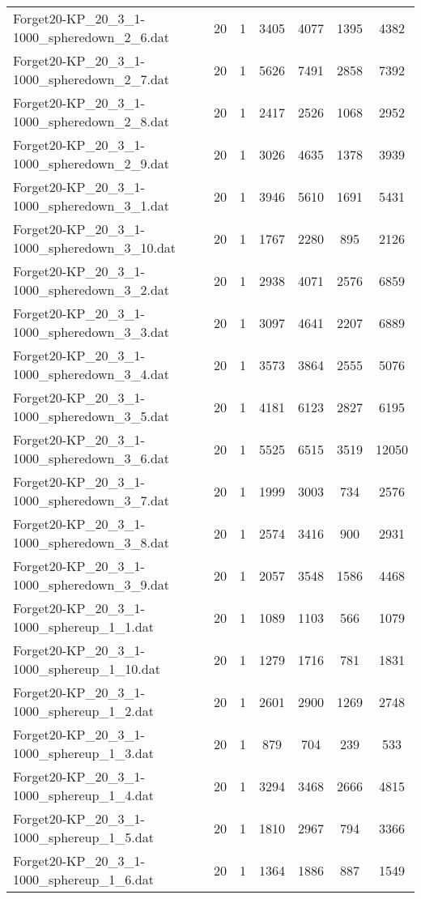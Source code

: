 \begin{table}[!ht]
\begin{tabular}{lcccccc}
Forget20-KP\_20\_3\_1-1000\_spheredown\_2\_6.dat & 20 & 1 & 3405 & 4077 & 1395 & 4382 \\
Forget20-KP\_20\_3\_1-1000\_spheredown\_2\_7.dat & 20 & 1 & 5626 & 7491 & 2858 & 7392 \\
Forget20-KP\_20\_3\_1-1000\_spheredown\_2\_8.dat & 20 & 1 & 2417 & 2526 & 1068 & 2952 \\
Forget20-KP\_20\_3\_1-1000\_spheredown\_2\_9.dat & 20 & 1 & 3026 & 4635 & 1378 & 3939 \\
Forget20-KP\_20\_3\_1-1000\_spheredown\_3\_1.dat & 20 & 1 & 3946 & 5610 & 1691 & 5431 \\
Forget20-KP\_20\_3\_1-1000\_spheredown\_3\_10.dat & 20 & 1 & 1767 & 2280 & 895 & 2126 \\
Forget20-KP\_20\_3\_1-1000\_spheredown\_3\_2.dat & 20 & 1 & 2938 & 4071 & 2576 & 6859 \\
Forget20-KP\_20\_3\_1-1000\_spheredown\_3\_3.dat & 20 & 1 & 3097 & 4641 & 2207 & 6889 \\
Forget20-KP\_20\_3\_1-1000\_spheredown\_3\_4.dat & 20 & 1 & 3573 & 3864 & 2555 & 5076 \\
Forget20-KP\_20\_3\_1-1000\_spheredown\_3\_5.dat & 20 & 1 & 4181 & 6123 & 2827 & 6195 \\
Forget20-KP\_20\_3\_1-1000\_spheredown\_3\_6.dat & 20 & 1 & 5525 & 6515 & 3519 & 12050 \\
Forget20-KP\_20\_3\_1-1000\_spheredown\_3\_7.dat & 20 & 1 & 1999 & 3003 & 734 & 2576 \\
Forget20-KP\_20\_3\_1-1000\_spheredown\_3\_8.dat & 20 & 1 & 2574 & 3416 & 900 & 2931 \\
Forget20-KP\_20\_3\_1-1000\_spheredown\_3\_9.dat & 20 & 1 & 2057 & 3548 & 1586 & 4468 \\
Forget20-KP\_20\_3\_1-1000\_sphereup\_1\_1.dat & 20 & 1 & 1089 & 1103 & 566 & 1079 \\
Forget20-KP\_20\_3\_1-1000\_sphereup\_1\_10.dat & 20 & 1 & 1279 & 1716 & 781 & 1831 \\
Forget20-KP\_20\_3\_1-1000\_sphereup\_1\_2.dat & 20 & 1 & 2601 & 2900 & 1269 & 2748 \\
Forget20-KP\_20\_3\_1-1000\_sphereup\_1\_3.dat & 20 & 1 & 879 & 704 & 239 & 533 \\
Forget20-KP\_20\_3\_1-1000\_sphereup\_1\_4.dat & 20 & 1 & 3294 & 3468 & 2666 & 4815 \\
Forget20-KP\_20\_3\_1-1000\_sphereup\_1\_5.dat & 20 & 1 & 1810 & 2967 & 794 & 3366 \\
Forget20-KP\_20\_3\_1-1000\_sphereup\_1\_6.dat & 20 & 1 & 1364 & 1886 & 887 & 1549 \\

\end{tabular}
\end{table}
